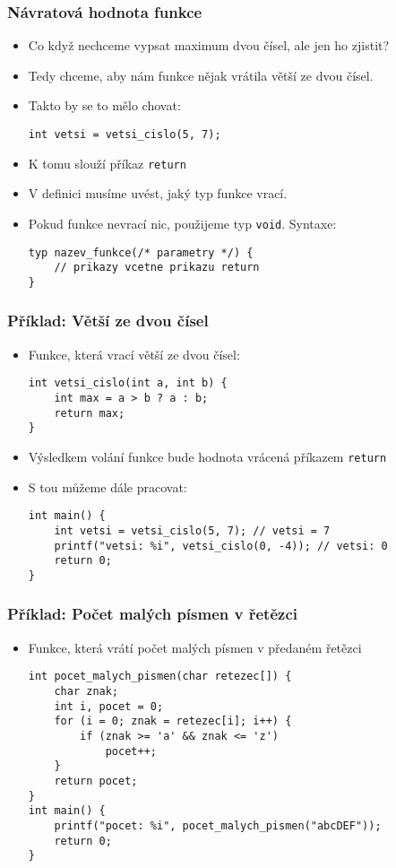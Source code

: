 \documentclass{beamer}
\begin{document}
\begin{frame}[t,fragile]\frametitle{Návratová hodnota funkce} 
    \begin{itemize}
        \item Co když nechceme vypsat maximum dvou čísel, ale jen ho zjistit? 
        \item Tedy chceme, aby nám funkce nějak vrátila větší ze dvou čísel.
        \item Takto by se to mělo chovat: 
        \begin{verbatim} 
int vetsi = vetsi_cislo(5, 7);
        \end{verbatim}
        \item K tomu slouží příkaz \texttt{return} 
        \item V definici musíme uvést, jaký typ funkce vrací. 
        \item Pokud funkce nevrací nic, použijeme typ \texttt{void}. Syntaxe:
        \begin{verbatim} 
typ nazev_funkce(/* parametry */) {
    // prikazy vcetne prikazu return
}
        \end{verbatim}
    \end{itemize}
\end{frame}


\begin{frame}[t,fragile]\frametitle{Příklad: Větší ze dvou čísel} 
    \begin{itemize}
        \item Funkce, která vrací větší ze dvou čísel:
        \begin{verbatim} 
int vetsi_cislo(int a, int b) {
    int max = a > b ? a : b;
    return max;
}
        \end{verbatim}
        \item Výsledkem volání funkce bude hodnota vrácená příkazem \texttt{return}
        \item S tou můžeme dále pracovat:
        \begin{verbatim} 
int main() {
    int vetsi = vetsi_cislo(5, 7); // vetsi = 7
    printf("vetsi: %i", vetsi_cislo(0, -4)); // vetsi: 0
    return 0;
}
        \end{verbatim}
    \end{itemize}
\end{frame}


\begin{frame}[t,fragile]\frametitle{Příklad: Počet malých písmen v řetězci} 
    \begin{itemize}
        \item Funkce, která vrátí počet malých písmen v předaném řetězci
        \begin{verbatim} 
int pocet_malych_pismen(char retezec[]) {
    char znak;
    int i, pocet = 0;
    for (i = 0; znak = retezec[i]; i++) {
        if (znak >= 'a' && znak <= 'z') 
            pocet++;
    }
    return pocet;
}
int main() {
    printf("pocet: %i", pocet_malych_pismen("abcDEF"));
    return 0;
}
        \end{verbatim}
    \end{itemize}
\end{frame}
\end{document}

